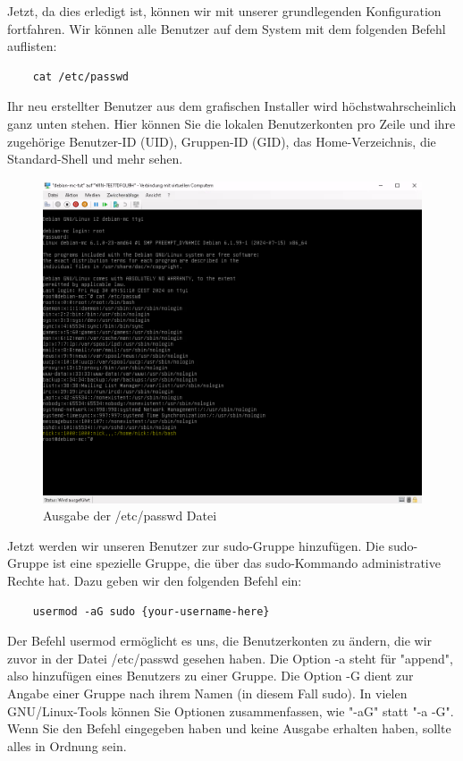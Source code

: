 \documentclass[]{article}
\begin{document}
Jetzt, da dies erledigt ist, können wir mit unserer grundlegenden Konfiguration fortfahren. Wir können alle Benutzer auf dem System mit dem folgenden Befehl auflisten:

\begin{verbatim}
    cat /etc/passwd
\end{verbatim}

Ihr neu erstellter Benutzer aus dem grafischen Installer wird höchstwahrscheinlich ganz unten stehen. Hier können Sie die lokalen Benutzerkonten pro Zeile und ihre zugehörige Benutzer-ID (UID), Gruppen-ID (GID), das Home-Verzeichnis, die Standard-Shell und mehr sehen.

\begin{figure}[h!]
    \caption{Ausgabe der /etc/passwd Datei}
    \centering
    \includegraphics[width=1\textwidth]{passwd}
\end{figure}
\FloatBarrier

Jetzt werden wir unseren Benutzer zur sudo-Gruppe hinzufügen. Die sudo-Gruppe ist eine spezielle Gruppe, die über das sudo-Kommando administrative Rechte hat. Dazu geben wir den folgenden Befehl ein:

\begin{verbatim}
    usermod -aG sudo {your-username-here}
\end{verbatim}

Der Befehl usermod ermöglicht es uns, die Benutzerkonten zu ändern, die wir zuvor in der Datei /etc/passwd gesehen haben. Die Option -a steht für "append", also hinzufügen eines Benutzers zu einer Gruppe. Die Option -G dient zur Angabe einer Gruppe nach ihrem Namen (in diesem Fall sudo). In vielen GNU/Linux-Tools können Sie Optionen zusammenfassen, wie "-aG" statt "-a -G". Wenn Sie den Befehl eingegeben haben und keine Ausgabe erhalten haben, sollte alles in Ordnung sein.
\end{document}
